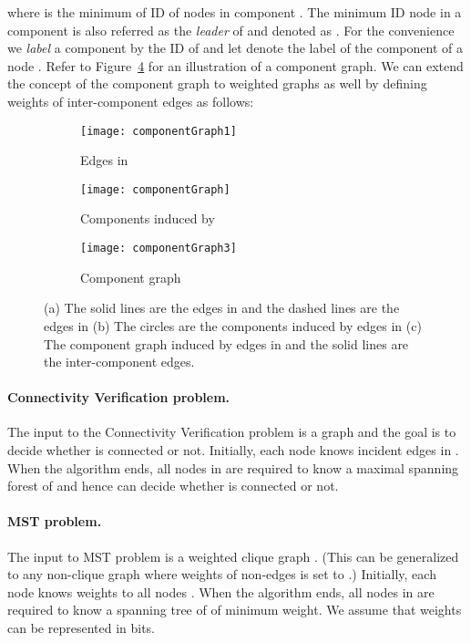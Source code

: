 \documentclass[11pt]{article}
\begin{document}
where  is the minimum of ID of nodes in component . 
The minimum ID node in a component  is also referred as the \textit{leader} of  and denoted as .
For the convenience we \textit{label} a component  by the ID of  and 
let  denote the label of the component of a node . 
Refer to Figure~\ref{fig:componentGraph} for an illustration of a component graph. 
We can extend the concept of the component graph to weighted graphs as well by defining weights of inter-component edges as follows:

\begin{figure}
  \begin{boxedminipage}{\textwidth}
    \centering
    \begin{subfigure}[b]{0.3\textwidth}
     \texttt{[image: componentGraph1]} 
      \caption{Edges in \label{subfig:edges}}
    \end{subfigure}
    \begin{subfigure}[b]{0.3\textwidth}
     \texttt{[image: componentGraph]} 
     \caption{Components induced by \label{subfig:component}}
    \end{subfigure}
    \begin{subfigure}[b]{0.3\textwidth}
     \texttt{[image: componentGraph3]}
      \caption{Component graph\label{subfig:cg}} 
    \end{subfigure}
  \end{boxedminipage}
  \caption{(a) The solid lines are the edges in  and the dashed lines are the edges in  (b) The circles are the components induced by edges in  (c) The component graph induced by edges in  and the solid lines are the inter-component edges. 
  \label{fig:componentGraph}}
\end{figure}
\paragraph{Connectivity Verification problem.}
The input to the Connectivity Verification problem is a graph  and the goal is to decide whether  is connected or not. 
Initially, each node  knows incident edges in . 
When the algorithm ends, all nodes in  are required to know a maximal spanning forest of  and hence can decide whether  is connected or not.

\paragraph{MST problem.}
The input to MST problem is a weighted clique graph . 
(This can be generalized to any non-clique graph where weights of non-edges is set to .)
Initially, each node  knows weights  to all nodes . 
When the algorithm ends, all nodes in  are required to know a spanning tree  of  of minimum weight.
We assume that weights can be represented in  bits. 
\end{document}
